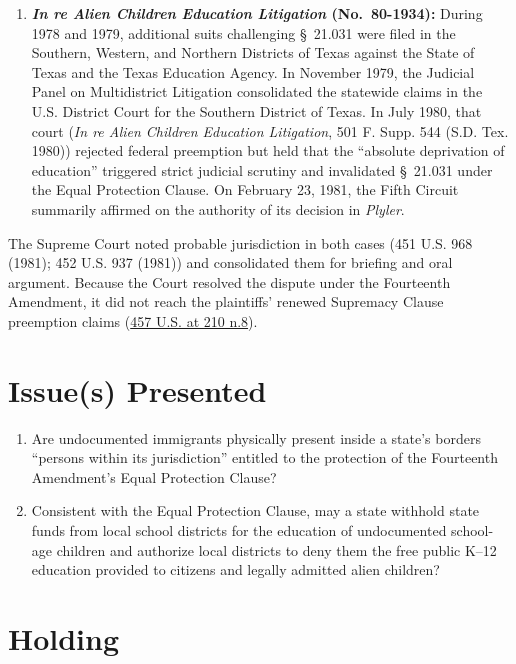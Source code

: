 \documentclass[12pt]{article}
\begin{document}
\begin{enumerate}
    \item \textbf{\textit{In re Alien Children Education Litigation} (No.\ 80-1934):} During 1978 and 1979, additional suits challenging \S~21.031 were filed in the Southern, Western, and Northern Districts of Texas against the State of Texas and the Texas Education Agency. In November 1979, the Judicial Panel on Multidistrict Litigation consolidated the statewide claims in the U.S. District Court for the Southern District of Texas. In July 1980, that court (\textit{In re Alien Children Education Litigation}, 501 F. Supp. 544 (S.D. Tex. 1980)) rejected federal preemption but held that the ``absolute deprivation of education'' triggered strict judicial scrutiny and invalidated \S~21.031 under the Equal Protection Clause. On February 23, 1981, the Fifth Circuit summarily affirmed on the authority of its decision in \textit{Plyler}.
\end{enumerate}

The Supreme Court noted probable jurisdiction in both cases (451 U.S. 968 (1981); 452 U.S. 937 (1981)) and consolidated them for briefing and oral argument. Because the Court resolved the dispute under the Fourteenth Amendment, it did not reach the plaintiffs' renewed Supremacy Clause preemption claims (\href{https://www.law.cornell.edu/supremecourt/text/457/202}{457 U.S. at 210 n.8}).

\section{Issue(s) Presented}

\begin{enumerate}
    \item Are undocumented immigrants physically present inside a state's borders ``persons within its jurisdiction'' entitled to the protection of the Fourteenth Amendment's Equal Protection Clause?
    \item Consistent with the Equal Protection Clause, may a state withhold state funds from local school districts for the education of undocumented school-age children and authorize local districts to deny them the free public K--12 education provided to citizens and legally admitted alien children?
\end{enumerate}

\section{Holding}
\end{document}
